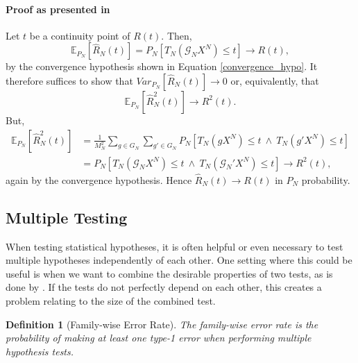 \documentclass[12pt, a4paper]{article}
\theoremstyle{MAstyle} \newtheorem{assumption}{Assumption}[section]
\theoremstyle{MAstyle} \newtheorem{definition}{Definition}[section]
\theoremstyle{MAstyle} \newtheorem{theorem}{Theorem}[section]
\begin{document}
			\paragraph{Proof as presented in \cite{lehmann_testing_2005}\\}
			Let $t$ be a continuity point of $R(t)$. Then, 
			\begin{equation}
				\mathbb{E}_{P_N}\left[\hat{R}_N(t)\right] = P_N\left[T_N(\mathcal{G}_NX^N) \leq t\right] \rightarrow R(t),
			\end{equation}
			by the convergence hypothesis shown in Equation \ref{convergence_hypo}. It therefore suffices to show that $\textit{Var}_{P_N}\left[\hat{R}_N(t)\right] \rightarrow 0$ or, equivalently, that
			\begin{equation}
				\mathbb{E}_{P_N}\left[\hat{R}_N^2(t)\right] \rightarrow R^2(t).
			\end{equation}
			But, 
			\begin{equation}
				\begin{split}
					\mathbb{E}_{P_N}\left[\hat{R}_N^2(t)\right] &= \frac{1}{M_N^2}\sum_{g \in G_N}\sum_{g' \in G_N} P_N\left[T_N(gX^N) \leq t \ \land \ T_N(g'X^N) \leq t\right] \\
					&= P_N\left[T_N(\mathcal{G}_NX^N) \leq t \ \land \ T_N(\mathcal{G}_N'X^N) \leq t\right] \rightarrow R^2(t),
				\end{split}
			\end{equation}
			again by the convergence hypothesis. Hence $\hat{R}_N(t) \rightarrow R(t)$ in $P_N$ probability.
			
		\subsection{Multiple Testing}\label{Multiple_Testing}
			When testing statistical hypotheses, it is often helpful or even necessary to test multiple hypotheses independently of each other. One setting where this could be useful is when we want to combine the desirable properties of two tests, as is done by \cite{bugni_permutation_2021}. If the tests do not perfectly depend on each other, this creates a problem relating to the size of the combined test.
			
			\begin{definition}[Family-wise Error Rate]
				The family-wise error rate is the probability of making at least one type-1 error when performing multiple hypothesis tests.
			\end{definition}
		
\end{document}
